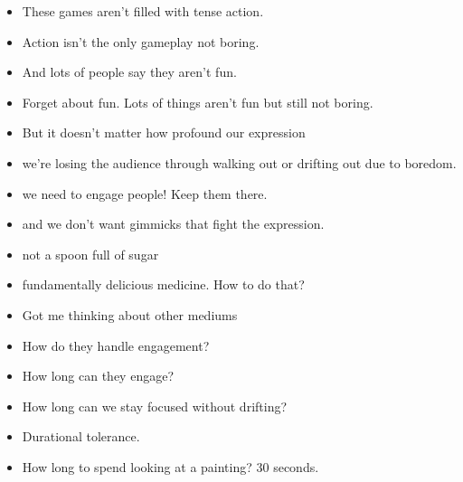 \documentclass[12pt]{article}
\begin{document}
{
\begin{itemize}
\item These games aren't filled with tense action.

\item Action isn't the only gameplay not boring.

\item And lots of people say they aren't fun.

\item Forget about fun.  Lots of things aren't fun but still not boring.

\item But it doesn't matter how profound our expression

\item we're losing the audience through walking out or drifting out due to boredom.

\item we need to engage people!  Keep them there.

\end{itemize}

\begin{itemize}

\item and we don't want gimmicks that fight the expression.

\item not a spoon full of sugar

\item fundamentally delicious medicine.  How to do that?
\end{itemize}

\begin{itemize}

\item Got me thinking about other mediums

\item How do they handle engagement?

\item How long can they engage?

\item How long can we stay focused without drifting?

\item Durational tolerance.

\item How long to spend looking at a painting?  30 seconds.


\end{itemize}}
\end{document}
